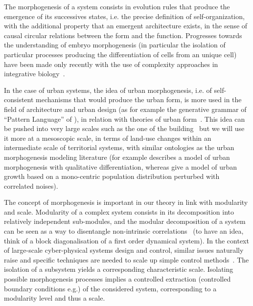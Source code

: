 \documentclass[letterpaper]{article}
\begin{document}



The morphogenesis of a system consists in evolution rules that produce the emergence of its successives states, i.e. the precise definition of self-organization, with the additional property that an emergent architecture exists, in the sense of causal circular relations between the form and the function. Progresses towards the understanding of embryo morphogenesis (in particular the isolation of particular processes producing the differentiation of cells from an unique cell) have been made only recently with the use of complexity approaches in integrative biology~\cite{delile2016chapitre}.


In the case of urban systems, the idea of urban morphogenesis, i.e. of self-consistent mechanisms that would produce the urban form, is more used in the field of architecture and urban design (as for example the generative grammar of ``Pattern Language'' of \cite{alexander1977pattern}), in relation with theories of urban form~\cite{moudon1997urban}. This idea can be pushed into very large scales such as the one of the building~\cite{whitehand1999urban} but we will use it more at a mesoscopic scale, in terms of land-use changes within an intermediate scale of territorial systems, with similar ontologies as the urban morphogenesis modeling literature (for example \cite{bonin2012modele} describes a model of urban morphogenesis with qualitative differentiation, whereas \cite{makse1998modeling} give a model of urban growth based on a mono-centric population distribution perturbed with correlated noises).


The concept of morphogenesis is important in our theory in link with modularity and scale. Modularity of a complex system consists in its decomposition into relatively independent sub-modules, and the modular decomposition of a system can be seen as a way to disentangle non-intrinsic correlations~\cite{2015arXiv150904386K} (to have an idea, think of a block diagonalisation of a first order dynamical system). In the context of large-scale cyber-physical systems design and control, similar issues naturally raise and specific techniques are needed to scale up simple control methods~\cite{2017arXiv170105880W}. The isolation of a subsystem yields a corresponding characteristic scale. Isolating possible morphogenesis processes implies a controlled extraction (controlled boundary conditions e.g.) of the considered system, corresponding to a modularity level and thus a scale.
\end{document}
